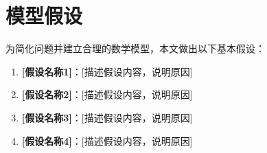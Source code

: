 
\section{模型假设}

为简化问题并建立合理的数学模型，本文做出以下基本假设：

\begin{enumerate}
    \item \textbf{[假设名称1]}：[描述假设内容，说明原因]
    \item \textbf{[假设名称2]}：[描述假设内容，说明原因]
    \item \textbf{[假设名称3]}：[描述假设内容，说明原因]
    \item \textbf{[假设名称4]}：[描述假设内容，说明原因]
\end{enumerate}

